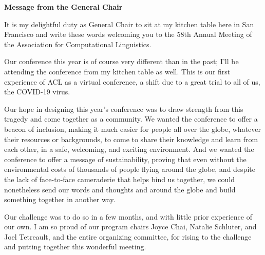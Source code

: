 \documentclass[11pt]{article}
\begin{document}
\begin{center}
  {\Large \bf Message from the General Chair}
\end{center}

It is my delightful duty as General Chair to sit at 
my kitchen table here in San Francisco and write these words welcoming you to the 58th
Annual Meeting of the Association for Computational Linguistics.

Our conference this year is of course very different than in the past;
I'll be attending the conference from my kitchen table as well.
This is our first experience of ACL as a virtual conference, a 
shift due to a great trial to all of us, the COVID-19 virus.

Our hope in designing this year's conference was to draw strength from this tragedy and come together
as a community. We wanted the conference to offer a beacon of inclusion,
making it much easier for people all over the globe, whatever
their resources or backgrounds, to come to share their knowledge
and learn from each other, in a safe, welcoming, and exciting environment.
And we wanted the conference to offer a message of sustainability,
proving that even without the environmental costs of thousands of people flying around the globe,
and despite the lack of face-to-face cameraderie that helps bind us together,
we could nonetheless send our words and thoughts and
around the globe and build something together in another way.

Our challenge was to do so in a few months, and with little prior experience of our own.
I am so proud of our program chairs Joyce Chai, Natalie Schluter, and Joel Tetreault,
and the entire organizing committee, for rising to the challenge and putting together this wonderful meeting.
\end{document}

